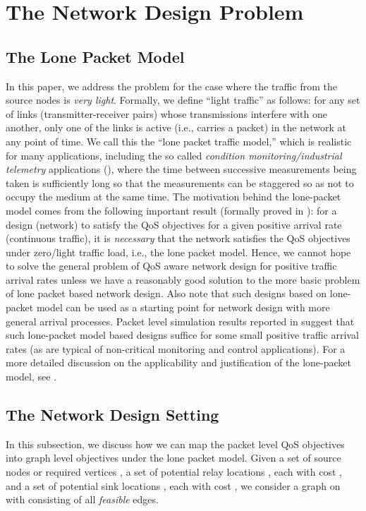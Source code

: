\documentclass[conference]{IEEEtran}
\begin{document}
\section{The Network Design Problem}
\label{sec:formulation}

\subsection{The Lone Packet Model}
In this paper, we address the problem for the case where the traffic from the source nodes is \emph{very light}. Formally, we define ``light traffic'' as follows: for any set of links (transmitter-receiver pairs) whose transmissions interfere with one another, only one of the links is active (i.e., carries a packet) in the network at any point of time. We call this the ``lone packet traffic model,'' which is realistic for many applications, including the so called \emph{condition monitoring/industrial telemetry} applications (\cite{telemetry1,telemetry2}), where the time between successive measurements being taken is sufficiently long so that the measurements can be staggered so as not to occupy the medium at the same time. The motivation behind the lone-packet model comes from the following important result (formally proved in \cite{fullpaper}): for a design (network) to satisfy the QoS objectives for a given positive arrival rate (continuous traffic), it is \emph{necessary} that the network satisfies the QoS objectives under zero/light traffic load, i.e., the lone packet model. Hence, we cannot hope to solve the general problem of QoS aware network design for positive traffic arrival rates unless we have a reasonably good solution to the more basic problem of lone packet based network design. Also note that such designs based on lone-packet model can be used as a starting point for network design with more general arrival processes. Packet level simulation results reported in \cite{fullpaper} suggest that such lone-packet model based designs suffice for some small positive traffic arrival rates (as are typical of non-critical monitoring and control applications). For a more detailed discussion on the applicability and justification of the lone-packet model, see \cite{fullpaper}. 
 
\subsection{The Network Design Setting}
\label{subsec:network-setting}
In this subsection, we discuss how we can map the packet level QoS objectives into graph level objectives under the lone packet model. Given a set of source nodes or required vertices , a set of potential relay locations , each with cost , and a set of potential sink locations , each with cost , we consider a graph  on  with  consisting of all \emph{feasible} edges. 
\end{document}
